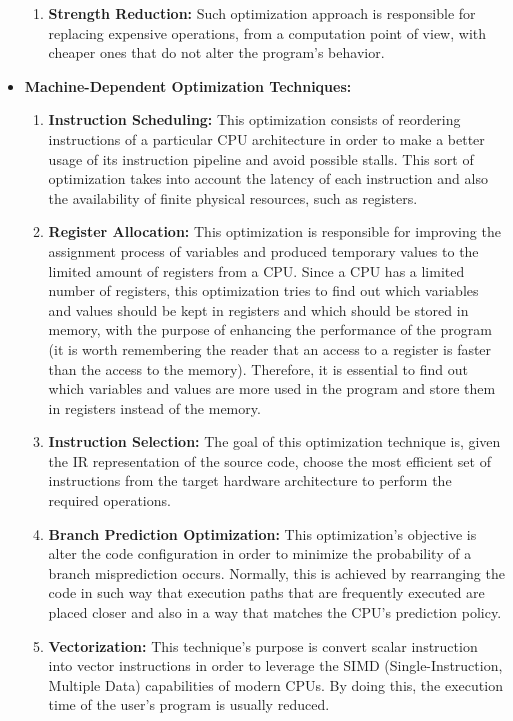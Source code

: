 \begin{itemize}
\begin{enumerate}
            \item \textbf{Strength Reduction:} Such optimization approach is responsible for replacing expensive operations, from a computation point of view, with cheaper ones that do not alter the program's behavior.
        \end{enumerate}
    \item \textbf{Machine-Dependent Optimization Techniques:}
        \begin{enumerate}
            \item \textbf{Instruction Scheduling:} This optimization consists of reordering instructions of a particular CPU architecture in order to make a better usage of its instruction pipeline and avoid possible stalls. This sort of optimization takes into account the latency of each instruction and also the availability of finite physical resources, such as registers.
            
            \item \textbf{Register Allocation:} This optimization is responsible for improving the assignment process of variables and produced temporary values to the limited amount of registers from a CPU. Since a CPU has a limited number of registers, this optimization tries to find out which variables and values should be kept in registers and which should be stored in memory, with the purpose of enhancing the performance of the program (it is worth remembering the reader that an access to a register is faster than the access to the memory). Therefore, it is essential to find out which variables and values are more used in the program and store them in registers instead of the memory.
            
            \item \textbf{Instruction Selection:} The goal of this optimization technique is, given the IR representation of the source code, choose the most efficient set of instructions from the target hardware architecture to perform the required operations.
            
            \item \textbf{Branch Prediction Optimization:} This optimization's objective is alter the code configuration in order to minimize the probability of a branch misprediction occurs. Normally, this is achieved by rearranging the code in such way that execution paths that are frequently executed are placed closer and also in a way that matches the CPU's prediction policy.
            
            \item \textbf{Vectorization:} This technique's purpose is convert scalar instruction into vector instructions in order to leverage the SIMD (Single-Instruction, Multiple Data) capabilities of modern CPUs. By doing this, the execution time of the user's program is usually reduced.
        
        \end{enumerate}
\end{itemize}

